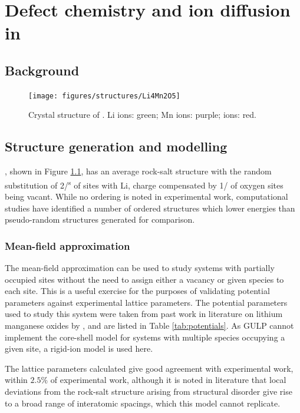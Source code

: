 \chapter{Defect chemistry and  ion diffusion in }
\section{Background}
\newpage
\begin{figure}
\centering
\texttt{[image: figures/structures/Li4Mn2O5]}
\caption[Crystal structure of ]{Crystal structure of . Li ions: green; Mn ions: purple;  ions: red.}
\label{fig:Li4Mn2O5-average}
\end{figure}
\section{Structure generation and modelling}
, shown in Figure \ref{fig:Li4Mn2O5-average}, has an average  rock-salt structure with the random substitution of 2/\textsuperscript{s} of  sites with Li, charge compensated by 1/ of oxygen sites being vacant.
While no ordering is noted in experimental work,\cite{Freire2016,Diaz-Lopez2018a} computational studies have identified a number of ordered structures which lower energies than pseudo-random structures generated for comparison.\cite{Diaz-Lopez2017,Bhandari2019}

\newpage
\subsection{Mean-field approximation}
The mean-field approximation can be used to study systems with partially occupied sites without the need to assign either a vacancy or given species to each site.
This is a useful exercise for the purposes of validating potential parameters against experimental lattice parameters.
The potential parameters used to study this system were taken from past work in literature on lithium manganese oxides by \citet{Ammundsen1999}, and are listed in Table \ref{tab:potentials}.
As GULP cannot implement the core-shell model for systems with multiple species occupying a given site, a rigid-ion model is used here.

The lattice parameters calculated give good agreement with experimental work, within $2.5\%$ of experimental work, although it is noted in literature that local deviations from the rock-salt structure arising from structural disorder give rise to a broad range of interatomic spacings, which this model cannot replicate.\cite{Yahia2019}

